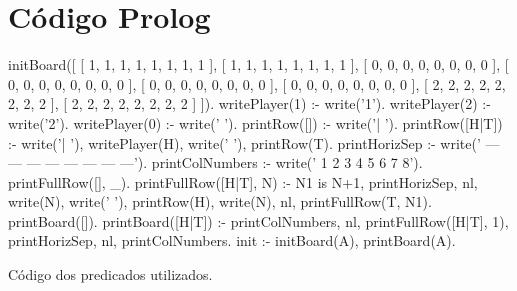 \documentclass[15pt,a4paper]{article}
\begin{document}
\renewcommand\refname{Bibliografia}



\nocite{tut1}
\nocite{tut2}


\newpage

\appendix
\section{Código Prolog}

\begin{code}[H]
	\begin{verbatimtab} %
initBoard([
	   [ 1, 1, 1, 1, 1, 1, 1, 1 ],
	   [ 1, 1, 1, 1, 1, 1, 1, 1 ],
	   [ 0, 0, 0, 0, 0, 0, 0, 0 ],
	   [ 0, 0, 0, 0, 0, 0, 0, 0 ],
	   [ 0, 0, 0, 0, 0, 0, 0, 0 ],
	   [ 0, 0, 0, 0, 0, 0, 0, 0 ],
	   [ 2, 2, 2, 2, 2, 2, 2, 2 ],
	   [ 2, 2, 2, 2, 2, 2, 2, 2 ]
	  ]).
writePlayer(1) :-
	write('1').
writePlayer(2) :-
	write('2').
writePlayer(0) :-
	write(' ').
printRow([])    :- 
	write('| ').
printRow([H|T]) :-
	write('| '),
	writePlayer(H),
	write(' '),
	printRow(T).
printHorizSep   :-
	write('   --- --- --- --- --- --- --- ---').
printColNumbers :-
	write('    1   2   3   4   5   6   7   8').
printFullRow([], _).
printFullRow([H|T], N) :-
	N1 is N+1,
	printHorizSep,
	nl,
	write(N),
	write(' '),
	printRow(H),
	write(N),
	nl,
	printFullRow(T, N1).
printBoard([]).
printBoard([H|T]) :-
	printColNumbers,
	nl,
	printFullRow([H|T], 1),
	printHorizSep,
	nl,
	printColNumbers.
init :-
	initBoard(A),
	printBoard(A).
\end{verbatimtab}
\caption{Código dos predicados utilizados.}
\end{code}
\end{document}
